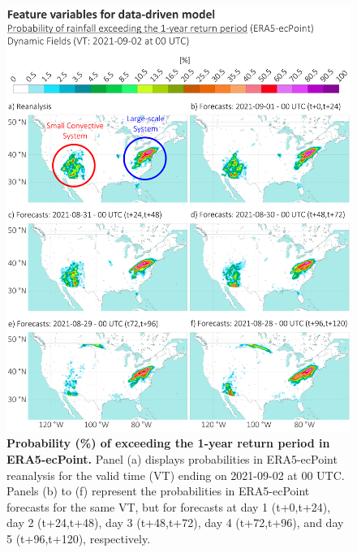 \begin{figure}[htbp]
\centering
\includegraphics[width=\textwidth]{prob_tp_exceeding_1rp.png}
\caption{\textbf{Probability (\%) of exceeding the 1-year return period in ERA5-ecPoint.} Panel (a) displays probabilities in ERA5-ecPoint reanalysis for the valid time (VT) ending on 2021-09-02 at 00 UTC. Panels (b) to (f) represent the probabilities in ERA5-ecPoint forecasts for the same VT, but for forecasts at day 1 (t+0,t+24), day 2 (t+24,t+48), day 3 (t+48,t+72), day 4 (t+72,t+96), and day 5 (t+96,t+120), respectively.}
\label{fig:prob_tp_exceeding_1rp}
\end{figure}

